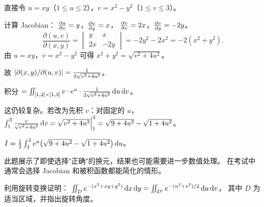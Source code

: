\documentclass{ctexart}
\begin{document}
\begin{solution}
  直接令 $u = xy$（$1 \le u \le 2$），$v = x^2-y^2$（$1 \le v \le 3$）。

  计算 Jacobian：
  $\frac{\partial u}{\partial x} = y$，$\frac{\partial u}{\partial y} = x$，
  $\frac{\partial v}{\partial x} = 2x$，$\frac{\partial v}{\partial y} = -2y$。
  \[
    \frac{\partial(u,v)}{\partial(x,y)} = \begin{vmatrix} y & x \\ 2x & -2y \end{vmatrix}
    = -2y^2 - 2x^2 = -2(x^2+y^2).
  \]
  由 $u = xy$，$v = x^2-y^2$ 可得 $x^2+y^2 = \sqrt{v^2+4u^2}$。

  故 $\left| \partial(x,y)/\partial(u,v) \right| = \frac{1}{2\sqrt{v^2+4u^2}}$。

  积分 $= \iint_{[1,2]\times[1,3]} v \cdot e^u \cdot \frac{1}{2\sqrt{v^2+4u^2}}\,\mathrm{d} u\,\mathrm{d} v$。

  这仍较复杂。若改为先积 $v$：对固定的 $u$，$\int_1^3 \frac{v}{\sqrt{v^2+4u^2}}\,\mathrm{d} v
  = \sqrt{v^2+4u^2}\Big|_1^3 = \sqrt{9+4u^2} - \sqrt{1+4u^2}$。

  $I = \frac{1}{2}\int_1^2 e^u\bigl(\sqrt{9+4u^2}-\sqrt{1+4u^2}\bigr)\,\mathrm{d} u$。

  此题展示了即使选择"正确"的换元，结果也可能需要进一步数值处理。
  在考试中通常会选择 Jacobian 和被积函数都能简化的情形。
\end{solution}

\begin{exercise}
  利用旋转变换证明：
  $\iint_D e^{-(x^2+xy+y^2)}\,\mathrm{d} x\,\mathrm{d} y
  = \iint_{D'} e^{-(u^2+v^2)/2}\,\mathrm{d} u\,\mathrm{d} v$，
  其中 $D$ 为适当区域，并指出旋转角度。
\end{exercise}
\end{document}
